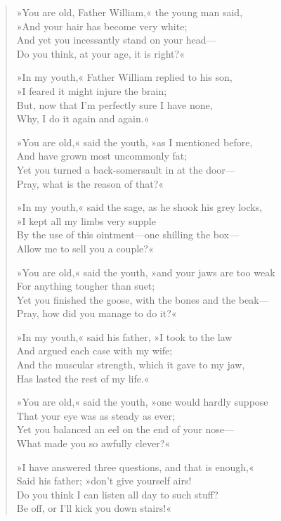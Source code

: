 \begin{verse}

»You are old, Father William,« the young man said,\\
\vin »And your hair has become very white;\\
And yet you incessantly stand on your head—\\
\vin Do you think, at your age, it is right?«

\begin{a4}
	\enlargethispage{\baselineskip}
\end{a4}

»In my youth,« Father William replied to his son,\\
\vin »I feared it might injure the brain;\\
But, now that I'm perfectly sure I have none,\\
\vin Why, I do it again and again.«

»You are old,« said the youth, »as I mentioned before,\\
\vin And have grown most uncommonly fat;\\
Yet you turned a back-somersault in at the door—\\
\vin Pray, what is the reason of that?«

»In my youth,« said the sage, as he shook his grey locks,\\
\vin »I kept all my limbs very supple\\
By the use of this ointment—one shilling the box—\\
\vin Allow me to sell you a couple?«

»You are old,« said the youth, »and your jaws are too weak\\
\vin For anything tougher than suet;\\
Yet you finished the goose, with the bones and the beak—\\
\vin Pray, how did you manage to do it?«

»In my youth,« said his father, »I took to the law\\
\vin And argued each case with my wife;\\
And the muscular strength, which it gave to my jaw,\\
\vin Has lasted the rest of my life.«

»You are old,« said the youth, »one would hardly suppose\\
\vin That your eye was as steady as ever;\\
Yet you balanced an eel on the end of your nose—\\
\vin What made you so awfully clever?«

»I have answered three questions, and that is enough,«\\
\vin Said his father; »don't give yourself airs!\\
Do you think I can listen all day to such stuff?\\
\vin Be off, or I'll kick you down stairs!«

\end{verse}


